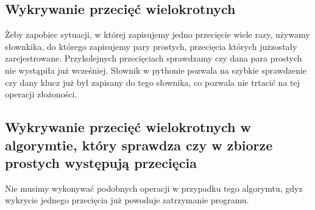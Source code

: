 \subsection{Wykrywanie przecięć wielokrotnych} 

Żeby zapobiec sytuacji, w której zapisujemy jedno przecięcie wiele razy, używamy słownkika, do którego zapisujemy pary prostych, przecięcia których jużzostały zarejestrowane. Przykolejnych przecięciach sprawdzamy czy dana para prostych nie wystąpiła już wcześniej. Słownik w pythonie pozwala na szybkie sprawdzenie czy dany klucz już był zapisany do tego słownika, co pozwala nie trtacić na tej operacji złożoności.

\subsection{Wykrywanie przecięć wielokrotnych w algorymtie, który sprawdza czy w zbiorze prostych występują przecięcia}

Nie musimy wykonywać podobnych operacji w przypadku tego algorymtu, gdyz wykrycie jednego przecięcia już powoduje zatrzymanie programu.






